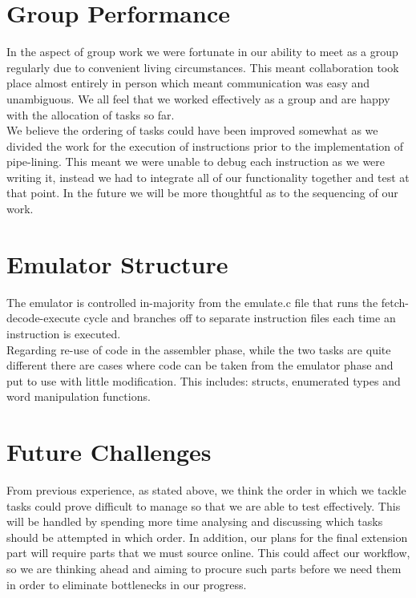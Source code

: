 \documentclass{article}
\begin{document}
\section{Group Performance}
In the aspect of group work we were fortunate in our ability to meet as a group regularly due to convenient living circumstances. This meant collaboration took place almost entirely in person which meant communication was easy and unambiguous. We all feel that we worked effectively as a group and are happy with the allocation of tasks so far. \\
We believe the ordering of tasks could have been improved somewhat as we divided the work for the execution of  instructions prior to the implementation of pipe-lining. This meant we were unable to debug each instruction as we were writing it, instead we had to integrate all of our functionality together and test at that point. In the future we will be more thoughtful as to the sequencing of our work.

\section{Emulator Structure}
The emulator is controlled in-majority from the emulate.c file that runs the fetch-decode-execute cycle and branches off to separate instruction files each time an instruction is executed.\\
Regarding re-use of code in the assembler phase, while the two tasks are quite different there are cases where code can be taken from the emulator phase and put to use with little modification. This includes: structs, enumerated types and word manipulation functions.

\section{Future Challenges}
From previous experience, as stated above, we think the order in which we tackle tasks could prove difficult to manage so that we are able to test effectively. This will be handled by spending more time analysing and discussing which tasks should be attempted in which order. In addition, our plans for the final extension part will require parts that we must source online. This could affect our workflow, so we are thinking ahead and aiming to procure such parts before we need them in order to eliminate bottlenecks in our progress.
\end{document}
